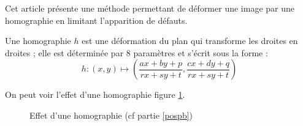 


\label{pospb}
	Cet article présente une méthode permettant de déformer une image par une homographie en limitant l'apparition de défauts.
	
	\begin{Def}
 	Une homographie $h$ est une déformation du plan qui transforme les droites en droites ; elle est déterminée par 8 paramètres et s'écrit sous la forme :
	\[h : (x,y)\mapsto\left( \frac{ax+by+p}{rx+sy+t},\frac{cx+dy+q}{rx+sy+t}\right)\]
	\label{definition_homographie}
	\end{Def}
On peut voir l'effet d'une homographie figure \ref{effethom}.\\

 \begin{figure}
 
   \centering
    \arrowPDP 
   \caption{Effet d'une homographie (cf partie \ref{pospb})}
\label{effethom}
 \end{figure}


